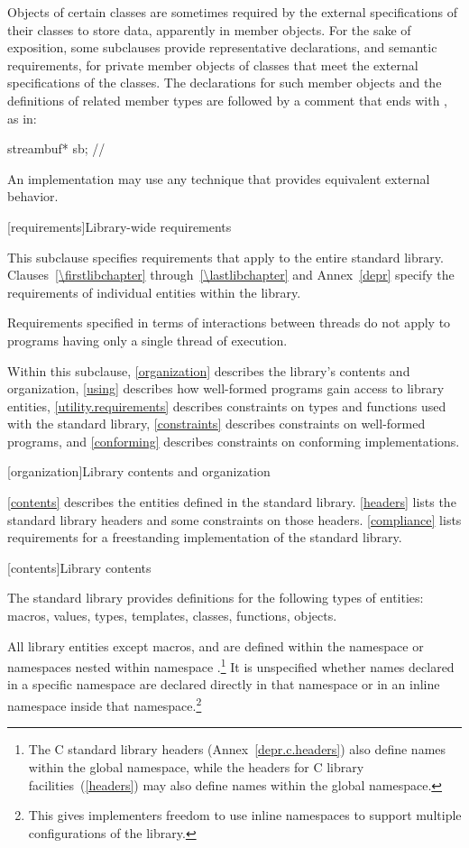 \pnum
Objects of certain classes are sometimes required by the external specifications of
their classes to store data, apparently in member objects. For the sake of exposition,
some subclauses provide representative declarations, and semantic requirements, for
private member objects of classes that meet the external specifications of the classes.
The declarations for such member objects and the definitions of related member types are
followed by a comment that ends with \expos, as in:

\begin{codeblock}
streambuf* sb;  // \expos
\end{codeblock}

\pnum
An implementation may use any technique that provides equivalent external behavior.

[requirements]{Library-wide requirements}

\pnum
This subclause specifies requirements that apply to the entire \Cpp standard library.
Clauses~\ref{\firstlibchapter} through~\ref{\lastlibchapter} and Annex~\ref{depr}
specify the requirements of individual entities within the library.

\pnum
Requirements specified in terms of interactions between threads do not apply to
programs having only a single thread of execution.

\pnum
Within this subclause, \ref{organization} describes the library's contents and
organization, \ref{using} describes how well-formed \Cpp programs gain access to library
entities,
\ref{utility.requirements} describes constraints on types and functions used with
the \Cpp standard library,
\ref{constraints} describes constraints on well-formed \Cpp programs, and
\ref{conforming} describes constraints on conforming implementations.

[organization]{Library contents and organization}

\pnum
\ref{contents} describes the entities defined in the \Cpp standard library.
\ref{headers} lists the standard library headers and some constraints on those headers.
\ref{compliance} lists requirements for a freestanding implementation of the \Cpp
standard library.

[contents]{Library contents}

\pnum
The \Cpp standard library provides definitions for the following types of entities:
macros, values, types, templates, classes, functions, objects.

\pnum
All library entities except macros,
and
are defined within the namespace
or namespaces nested within namespace
.\footnote{The C standard library headers (Annex~\ref{depr.c.headers}) also define
names within the global namespace, while the \Cpp headers for C library
facilities~(\ref{headers}) may also define names within the global namespace.}%
It is unspecified whether names declared in a specific namespace are declared
directly in that namespace or in an inline namespace inside that
namespace.\footnote{This gives implementers freedom to use inline namespaces to
support multiple configurations of the library.}

